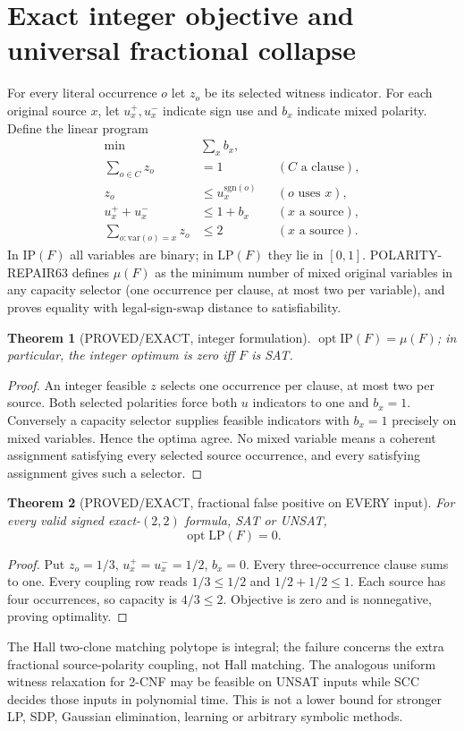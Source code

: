 \documentclass[11pt]{article}
\newtheorem{theorem}{Theorem}
\begin{document}
\section{Exact integer objective and universal fractional collapse}
For every literal occurrence $o$ let $z_o$ be its selected witness indicator. For each original source $x$, let $u_x^+,u_x^-$ indicate sign use and $b_x$ indicate mixed polarity. Define the linear program
\begin{align}
\min\quad&\sum_x b_x,\\
\sum_{o\in C}z_o&=1 &&(C\text{ a clause}),\\
z_o&\le u_x^{\mathrm{sgn}(o)}&&(o\text{ uses }x),\\
u_x^++u_x^-&\le1+b_x&&(x\text{ a source}),\\
\sum_{o:\mathrm{var}(o)=x}z_o&\le2&&(x\text{ a source}).\tag{1}
\end{align}
In $\mathrm{IP}(F)$ all variables are binary; in $\mathrm{LP}(F)$ they lie in $[0,1]$. POLARITY-REPAIR63 defines $\mu(F)$ as the minimum number of mixed original variables in any capacity selector (one occurrence per clause, at most two per variable), and proves equality with legal-sign-swap distance to satisfiability.

\begin{theorem}[PROVED/EXACT, integer formulation]
$\operatorname{opt}\mathrm{IP}(F)=\mu(F)$; in particular, the integer optimum is zero iff $F$ is SAT.
\end{theorem}
\begin{proof}
An integer feasible $z$ selects one occurrence per clause, at most two per source. Both selected polarities force both $u$ indicators to one and $b_x=1$. Conversely a capacity selector supplies feasible indicators with $b_x=1$ precisely on mixed variables. Hence the optima agree. No mixed variable means a coherent assignment satisfying every selected source occurrence, and every satisfying assignment gives such a selector.
\end{proof}

\begin{theorem}[PROVED/EXACT, fractional false positive on EVERY input]
For every valid signed exact-$(2,2)$ formula, SAT or UNSAT,
\[
\boxed{\operatorname{opt}\mathrm{LP}(F)=0}.
\]
\end{theorem}
\begin{proof}
Put $z_o=1/3$, $u_x^+=u_x^-=1/2$, $b_x=0$. Every three-occurrence clause sums to one. Every coupling row reads $1/3\le1/2$ and $1/2+1/2\le1$. Each source has four occurrences, so capacity is $4/3\le2$. Objective is zero and is nonnegative, proving optimality.
\end{proof}
The Hall two-clone matching polytope is integral; the failure concerns the extra fractional source-polarity coupling, not Hall matching. The analogous uniform witness relaxation for 2-CNF may be feasible on UNSAT inputs while SCC decides those inputs in polynomial time. This is not a lower bound for stronger LP, SDP, Gaussian elimination, learning or arbitrary symbolic methods.
\end{document}
